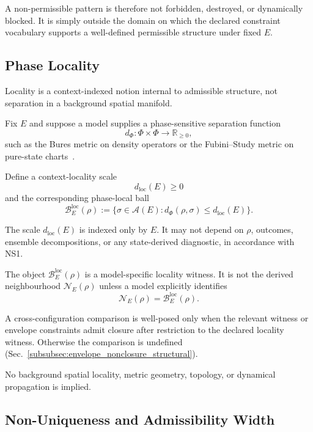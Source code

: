 \documentclass[aps,prx,onecolumn,11pt]{revtex4-2}
\theoremstyle{plain}
\theoremstyle{definition}
\theoremstyle{remark}
\begin{document}
A non-permissible pattern is therefore not forbidden, destroyed, or
dynamically blocked. It is simply outside the domain on which the
declared constraint vocabulary supports a well-defined permissible
structure under fixed \(E\).

\subsection{Phase Locality}
\label{subsec:phase_locality_struct}

Locality is a context-indexed notion internal to admissible structure,
not separation in a background spatial manifold.

Fix \(E\) and suppose a model supplies a phase-sensitive separation
function
\[
d_\Phi:\Phi\times\Phi\to\mathbb R_{\geq 0},
\]
such as the Bures metric on density operators or the Fubini--Study
metric on pure-state charts~\cite{BengtssonZyczkowski2006,
NielsenChuang2010,Watrous2018}.

Define a context-locality scale
\[
d_{\mathrm{loc}}(E)\geq 0
\]
and the corresponding phase-local ball
\begin{equation}
\mathcal B_E^{\mathrm{loc}}(\rho)
:=
\{
\sigma\in\mathcal A(E):
d_\Phi(\rho,\sigma)\leq d_{\mathrm{loc}}(E)
\}.
\label{eq:phase_local_ball_struct}
\end{equation}

The scale \(d_{\mathrm{loc}}(E)\) is indexed only by \(E\). It may not
depend on \(\rho\), outcomes, ensemble decompositions, or any
state-derived diagnostic, in accordance with NS1.

The object \(\mathcal B_E^{\mathrm{loc}}(\rho)\) is a
model-specific locality witness. It is not the derived neighbourhood
\(\mathcal N_E(\rho)\) unless a model explicitly identifies
\[
\mathcal N_E(\rho)
=
\mathcal B_E^{\mathrm{loc}}(\rho).
\]

A cross-configuration comparison is well-posed only when the relevant
witness or envelope constraints admit closure after restriction to the
declared locality witness. Otherwise the comparison is undefined
(Sec.~\ref{subsubsec:envelope_nonclosure_structural}).

No background spatial locality, metric geometry, topology, or dynamical
propagation is implied.

\subsection{Non-Uniqueness and Admissibility Width}
\label{subsec:admissibility_width_struct}
\end{document}
